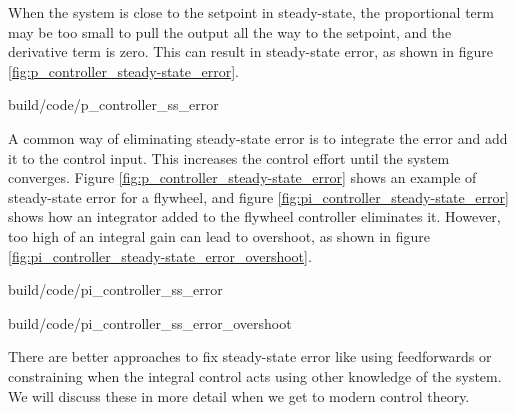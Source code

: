 When the \gls{system} is close to the \gls{setpoint} in steady-state, the
proportional term may be too small to pull the \gls{output} all the way to the
\gls{setpoint}, and the derivative term is zero. This can result in
\gls{steady-state error}, as shown in figure
\ref{fig:p_controller_steady-state_error}.

\begin{svg}{build/code/p_controller_ss_error}
  \caption{P controller with steady-state error}
  \label{fig:p_controller_steady-state_error}
\end{svg}

A common way of eliminating \gls{steady-state error} is to integrate the
\gls{error} and add it to the \gls{control input}. This increases the
\gls{control effort} until the \gls{system} converges. Figure
\ref{fig:p_controller_steady-state_error} shows an example of
\gls{steady-state error} for a flywheel, and figure
\ref{fig:pi_controller_steady-state_error} shows how an integrator added to the
flywheel controller eliminates it. However, too high of an integral gain can
lead to overshoot, as shown in figure
\ref{fig:pi_controller_steady-state_error_overshoot}.

\begin{bookfigure}
  \begin{minisvg}{build/code/pi_controller_ss_error}
    \caption{PI controller without steady-state error}
    \label{fig:pi_controller_steady-state_error}
  \end{minisvg}
  \hfill
  \begin{minisvg}{build/code/pi_controller_ss_error_overshoot}
    \caption{PI controller with overshoot from large $K_i$ gain}
    \label{fig:pi_controller_steady-state_error_overshoot}
  \end{minisvg}
\end{bookfigure}

There are better approaches to fix \gls{steady-state error} like using
feedforwards or constraining when the integral control acts using other
knowledge of the \gls{system}. We will discuss these in more detail when we get
to modern control theory.
